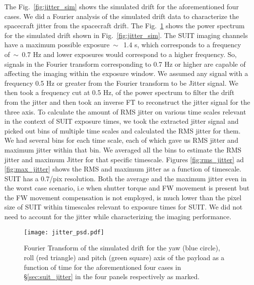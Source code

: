 The Fig.~\ref{fig:jitter_sim} shows the simulated drift for the aforementioned four cases. We did a Fourier analysis of the simulated drift data to characterize the spacecraft jitter from the spacecraft drift. The Fig.~\ref{fig:jitter_sim_ps} shows the power spectrum for the simulated drift shown in Fig.~\ref{fig:jitter_sim}. The SUIT imaging channels have a maximum possible exposure$~\sim$~1.4 s, which corresponds to a frequency of~$\sim$~0.7 Hz and lower exposures would correspond to a higher frequency. So, signals in the Fourier transform corresponding to 0.7 Hz or higher are capable of affecting the imaging within the exposure window. We assumed any signal with a frequency 0.5 Hz or greater from the Fourier transform to be Jitter signal. We then took a frequency cut at 0.5 Hz, of the power spectrum to filter the drift from the jitter and then took an inverse FT to reconstruct the jitter signal for the three axis. To calculate the amount of RMS jitter on various time scales relevant in the context of SUIT exposure times, we took the extracted jitter signal and picked out bins of multiple time scales and calculated the RMS jitter for them. We had several bins for each time scale, each of which gave us RMS jitter and maximum jitter within that bin. We averaged all the bins to estimate the RMS jitter and maximum Jitter for that specific timescale. Figures \ref{fig:rms_jitter} ad \ref{fig:max_jitter} shows the RMS and maximum jitter as a function of timescale. SUIT has a 0.7\arcsec/pix resolution. Both the average and the maximum jitter even in the worst case scenario, i.e when shutter torque and FW movement is present but the FW movement compensation is not employed, is much lower than the pixel size of SUIT within timescales relevant to exposure times for SUIT. We did not need to account for the jitter while characterizing the imaging performance.

\begin{figure}[ht!]
    \centering
    \texttt{[image: jitter\_psd.pdf]}
    \caption[Fourier transform of the simulated drift for the yaw, roll and pitch axis.]{Fourier Transform of the simulated drift for the yaw (blue circle), roll (red triangle) and pitch (green square) axis of the payload as a function of time for the aforementioned four cases in \S\ref{sec:suit_jitter} in the four panels respectively as marked.}
    \label{fig:jitter_sim_ps}
\end{figure}

